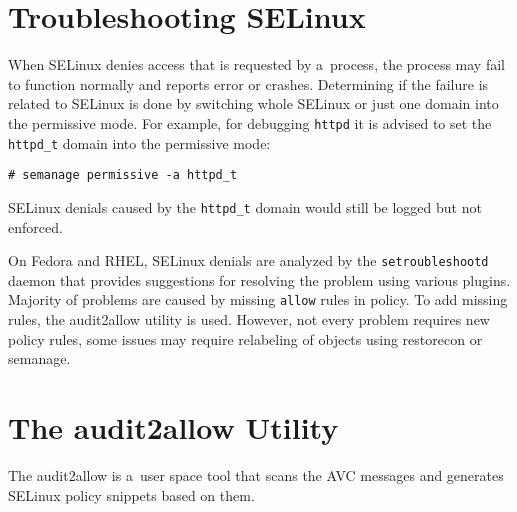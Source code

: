 \section{Troubleshooting SELinux}

When SELinux denies access that is requested by a~process, the process may fail
to function normally and reports error or crashes. Determining if the failure is
related to SELinux is done by switching whole SELinux or just one domain into
the permissive mode. For example, for debugging \texttt{httpd} it is advised to
set the \texttt{httpd\_t} domain into the permissive mode:
\begin{lstlisting}
# semanage permissive -a httpd_t
\end{lstlisting}
SELinux denials caused by the \texttt{httpd\_t} domain would still be logged but
not enforced.

On Fedora and RHEL, SELinux denials are analyzed by the \texttt{setroubleshootd}
daemon that provides suggestions for resolving the problem using various
plugins. Majority of problems are caused by missing \texttt{allow} rules in
policy. To add missing rules, the audit2allow utility is used. However, not
every problem requires new policy rules, some issues may require relabeling of
objects using restorecon or semanage.

\section{The audit2allow Utility}
\label{audit2allow}
The audit2allow is a~user space tool that scans the AVC messages and generates
SELinux policy snippets based on them.

